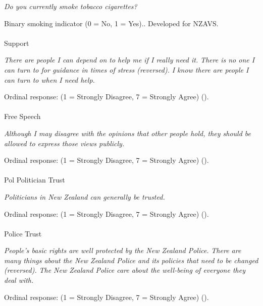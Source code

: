 \documentclass[
  single column]{article}
\makeatletter
\let\oldparagraph\paragraph
\renewcommand{\paragraph}{
    \@ifstar
      \xxxParagraphStar
      \xxxParagraphNoStar
  }
\newcommand{\xxxParagraphStar}[1]{\oldparagraph*{#1}\mbox{}}
\newcommand{\xxxParagraphNoStar}[1]{\oldparagraph{#1}\mbox{}}
\makeatother
\begin{document}
\emph{Do you currently smoke tobacco cigarettes?}

Binary smoking indicator (0 = No, 1 = Yes).. Developed for NZAVS.

\paragraph{Support}\label{support}

\emph{There are people I can depend on to help me if I really need it.}
\emph{There is no one I can turn to for guidance in times of stress
(reversed).} \emph{I know there are people I can turn to when I need
help.}

Ordinal response: (1 = Strongly Disagree, 7 = Strongly Agree)
().

\paragraph{Free Speech}\label{free-speech}

\emph{Although I may disagree with the opinions that other people hold,
they should be allowed to express those views publicly.}

Ordinal response: (1 = Strongly Disagree, 7 = Strongly Agree)
().

\paragraph{Pol Politician Trust}\label{pol-politician-trust}

\emph{Politicians in New Zealand can generally be trusted.}

Ordinal response: (1 = Strongly Disagree, 7 = Strongly Agree)
().

\paragraph{Police Trust}\label{police-trust}

\emph{People's basic rights are well protected by the New Zealand
Police.} \emph{There are many things about the New Zealand Police and
its policies that need to be changed (reversed).} \emph{The New Zealand
Police care about the well-being of everyone they deal with.}

Ordinal response: (1 = Strongly Disagree, 7 = Strongly Agree)
().
\end{document}
